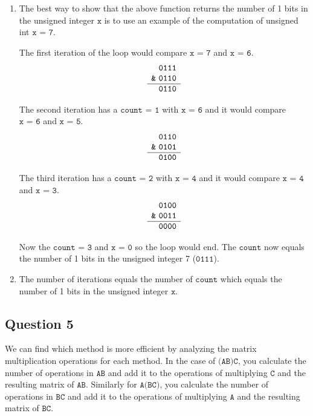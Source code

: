 \documentclass[letterpaper, 12pt]{article}
\begin{document}
\begin{enumerate}
    \item The best way to show that the above function returns the number of 1 bits in the unsigned integer $\texttt{x}$ is to use an example of the computation of unsigned int $\texttt{x = 7}$.
    
    
    The first iteration of the loop would compare $\texttt{x = 7}$ and $\texttt{x = 6}$.
    \[\begin{array}[t]{r}
        \texttt{0111}\\
    \texttt{\&} \ \texttt{0110}\\ \hline
        \texttt{0110}
    \end{array}\]
    
    The second iteration has a $\texttt{count = 1}$ with $\texttt{x = 6}$ and it would compare $\texttt{x = 6}$ and $\texttt{x = 5}$.
    \[\begin{array}[t]{r}
        \texttt{0110}\\
    \texttt{\&} \ \texttt{0101}\\ \hline
        \texttt{0100}
    \end{array}\]
    
    The third iteration has a $\texttt{count = 2}$ with $\texttt{x = 4}$ and it would compare $\texttt{x = 4}$ and $\texttt{x = 3}$.
    \[\begin{array}[t]{r}
        \texttt{0100}\\
    \texttt{\&} \ \texttt{0011}\\ \hline
        \texttt{0000}
    \end{array}\]
    
    Now the $\texttt{count = 3}$ and $\texttt{x = 0}$ so the loop would end. The $\texttt{count}$ now equals the number of 1 bits in the unsigned integer 7 ($\texttt{0111}$).
    
    \item The number of iterations equals the number of $\texttt{count}$ which equals the number of 1 bits in the unsigned integer $\texttt{x}$.
\end{enumerate}

\subsection*{Question 5}
We can find which method is more efficient by analyzing the matrix multiplication operations for each method. In the case of $\texttt{(AB)C}$, you calculate the number of operations in $\texttt{AB}$ and add it to the operations of multiplying $\texttt{C}$ and the resulting matrix of $\texttt{AB}$. Similarly for $\texttt{A(BC)}$, you calculate the number of operations in $\texttt{BC}$ and add it to the operations of multiplying $\texttt{A}$ and the resulting matrix of $\texttt{BC}$.
\end{document}
